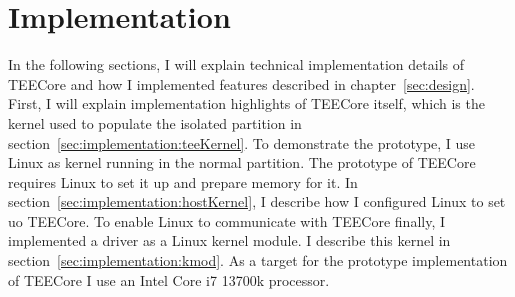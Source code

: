 \chapter{Implementation}
\label{sec:implementation}


In the following sections, I will explain technical implementation details of
TEECore and how I implemented features described in chapter~\ref{sec:design}.
First, I will explain implementation highlights of TEECore itself, which is the
kernel used to populate the isolated partition in
section~\ref{sec:implementation:teeKernel}. To demonstrate the prototype, I use
Linux as kernel running in the normal partition. The prototype of TEECore
requires Linux to set it up and prepare memory for it. In
section~\ref{sec:implementation:hostKernel}, I describe how I configured Linux
to set uo TEECore. To enable Linux to communicate with TEECore finally, I
implemented a driver as a Linux kernel module. I describe this kernel in
section~\ref{sec:implementation:kmod}. As a target for the prototype implementation of TEECore I use an
Intel Core i7 13700k processor.

